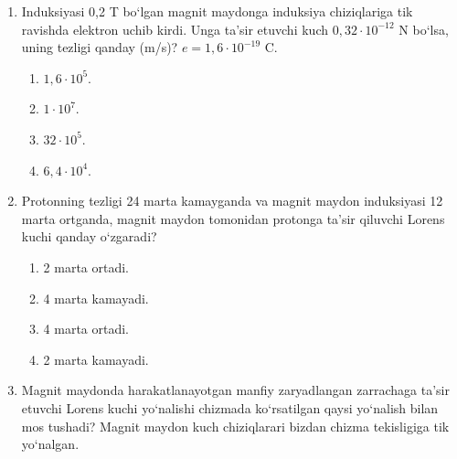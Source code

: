 \begin{enumerate}
\item Induksiyasi 0,2 T bo‘lgan magnit maydonga induksiya chiziqlariga tik ravishda elektron uchib kirdi. Unga ta’sir etuvchi kuch $0,32 \cdot 10^{-12}$ N bo‘lsa, uning tezligi qanday (m/s)? $e = 1,6 \cdot 10^{-19}$ C.
\begin{enumerate}[label=\Alph*)]
\item $1,6 \cdot 10^5$.
\item $1 \cdot 10^7$.
\item $32 \cdot 10^5$.
\item $6,4 \cdot 10^4$.
\end{enumerate}

\item Protonning tezligi 24 marta kamayganda va magnit maydon induksiyasi 12 marta ortganda, magnit maydon tomonidan protonga ta’sir qiluvchi Lorens kuchi qanday o‘zgaradi?
\begin{enumerate}[label=\Alph*)]
\item 2 marta ortadi.
\item 4 marta kamayadi.
\item 4 marta ortadi.
\item 2 marta kamayadi.
\end{enumerate}


\item Magnit maydonda harakatlanayotgan manfiy zaryadlangan zarrachaga ta’sir etuvchi Lorens kuchi yo‘nalishi chizmada ko‘rsatilgan qaysi yo‘nalish bilan mos tushadi? Magnit maydon kuch chiziqlarari bizdan chizma tekisligiga tik yo‘nalgan.



\end{enumerate}
